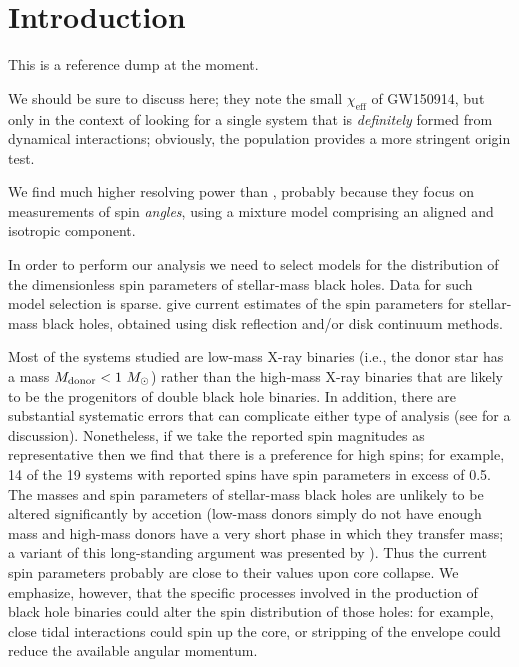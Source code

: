 \documentclass[modern]{aastex61}
\newcommand{\chieff}{\chi_\mathrm{eff}}
\begin{document}
\acresetall{}

\section{Introduction}

This is a reference dump at the moment.  

We should be sure to discuss \citet{Rodriguez2016} here; they note the
small $\chieff$ of GW150914, but only in the context of looking for a
single system that is \emph{definitely} formed from dynamical
interactions; obviously, the population provides a more stringent
origin test.

We find much higher resolving power than \citet{Vitale2015}, probably
because they focus on measurements of spin \emph{angles}, using a
mixture model comprising an aligned and isotropic component.

In order to perform our analysis we need to select models for the 
distribution of the dimensionless spin parameters of stellar-mass black 
holes.  Data for such model selection is sparse.  \citet{2015PhR...548....1M} 
give current estimates of the spin parameters for stellar-mass black holes, 
obtained using disk reflection and/or disk continuum methods.  

Most of the systems studied are low-mass X-ray binaries (i.e., the donor star 
has a mass $M_{\rm donor}<1~M_\odot$) rather than the high-mass X-ray binaries 
that are likely to be the progenitors of double black hole binaries.  In 
addition, there are substantial systematic errors that can complicate either 
type of analysis (see \citealt{2015PhR...548....1M} for a discussion). Nonetheless, 
if we take the reported spin magnitudes as representative then we find that there 
is a preference for high spins; for example, 14 of the 19 systems with reported 
spins have spin parameters in excess of 0.5.  The masses and spin parameters of 
stellar-mass black holes are unlikely to be altered significantly by accetion 
(low-mass donors simply do not have enough mass and high-mass donors have a very 
short phase in which they transfer mass; a variant of this long-standing argument 
was presented by \citealt{1999MNRAS.305..654K}).  Thus the current spin parameters 
probably are close to their values upon core collapse.  We emphasize, however, 
that the specific processes involved in the production of black hole binaries 
could alter the spin distribution of those holes: for example, close tidal 
interactions could spin up the core, or stripping of the envelope could reduce the 
available angular momentum.
\end{document}
